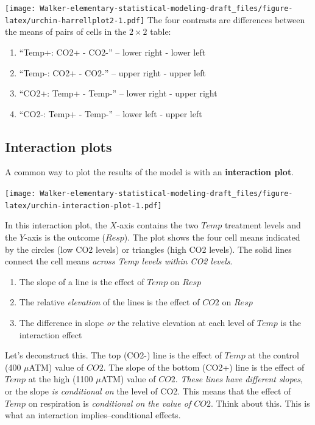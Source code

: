 \documentclass[]{book}
\providecommand{\tightlist}{%
  \setlength{\itemsep}{0pt}\setlength{\parskip}{0pt}}
\begin{document}
\texttt{[image: Walker-elementary-statistical-modeling-draft\_files/figure-latex/urchin-harrellplot2-1.pdf]}
The four contrasts are differences between the means of pairs of cells
in the \(2 \times 2\) table:

\begin{enumerate}
\def\labelenumi{\arabic{enumi}.}
\tightlist
\item
  ``Temp+: CO2+ - CO2-'' -- lower right - lower left
\item
  ``Temp-: CO2+ - CO2-'' -- upper right - upper left
\item
  ``CO2+: Temp+ - Temp-'' -- lower right - upper right
\item
  ``CO2-: Temp+ - Temp-'' -- lower left - upper left
\end{enumerate}

\subsection{Interaction plots}\label{interaction-plots}

A common way to plot the results of the model is with an
\textbf{interaction plot}.

\texttt{[image: Walker-elementary-statistical-modeling-draft\_files/figure-latex/urchin-interaction-plot-1.pdf]}

In this interaction plot, the \(X\)-axis contains the two \(Temp\)
treatment levels and the \(Y\)-axis is the outcome (\(Resp\)). The plot
shows the four cell means indicated by the circles (low CO2 levels) or
triangles (high CO2 levels). The solid lines connect the cell means
\emph{across Temp levels within CO2 levels}.

\begin{enumerate}
\def\labelenumi{\arabic{enumi}.}
\tightlist
\item
  The slope of a line is the effect of \(Temp\) on \(Resp\)
\item
  The relative \emph{elevation} of the lines is the effect of \(CO2\) on
  \(Resp\)
\item
  The difference in slope \emph{or} the relative elevation at each level
  of \(Temp\) is the interaction effect
\end{enumerate}

Let's deconstruct this. The top (CO2-) line is the effect of \(Temp\) at
the control (400 \(\mu\)ATM) value of \(CO2\). The slope of the bottom
(CO2+) line is the effect of \(Temp\) at the high (1100 \(\mu\)ATM)
value of \(CO2\). \emph{These lines have different slopes}, or the slope
\emph{is conditional on} the level of CO2. This means that the effect of
\(Temp\) on respiration is \emph{conditional on the value of \(CO2\)}.
Think about this. This is what an interaction implies--conditional
effects.
\end{document}

